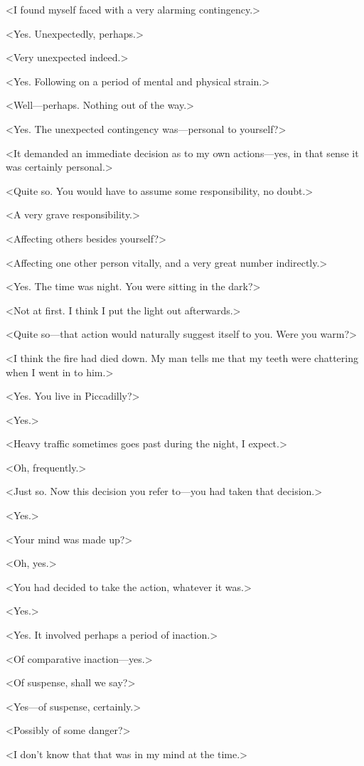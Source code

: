 <I found myself faced with a very alarming contingency.>

<Yes. Unexpectedly, perhaps.>

<Very unexpected indeed.>

<Yes. Following on a period of mental and physical strain.>

<Well—perhaps. Nothing out of the way.>

<Yes. The unexpected contingency was—personal to yourself?>

<It demanded an immediate decision as to my own actions—yes, in that sense it was certainly personal.>

<Quite so. You would have to assume some responsibility, no doubt.>

<A very grave responsibility.>

<Affecting others besides yourself?>

<Affecting one other person vitally, and a very great number indirectly.>

<Yes. The time was night. You were sitting in the dark?>

<Not at first. I think I put the light out afterwards.>

<Quite so—that action would naturally suggest itself to you. Were you warm?>

<I think the fire had died down. My man tells me that my teeth were chattering when I went in to him.>

<Yes. You live in Piccadilly?>

<Yes.>

<Heavy traffic sometimes goes past during the night, I expect.>

<Oh, frequently.>

<Just so. Now this decision you refer to—you had taken that decision.>

<Yes.>

<Your mind was made up?>

<Oh, yes.>

<You had decided to take the action, whatever it was.>

<Yes.>

<Yes. It involved perhaps a period of inaction.>

<Of comparative inaction—yes.>

<Of suspense, shall we say?>

<Yes—of suspense, certainly.>

<Possibly of some danger?>

<I don't know that that was in my mind at the time.>

